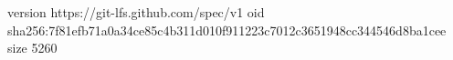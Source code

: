 version https://git-lfs.github.com/spec/v1
oid sha256:7f81efb71a0a34ce85c4b311d010f911223c7012c3651948cc344546d8ba1cee
size 5260
